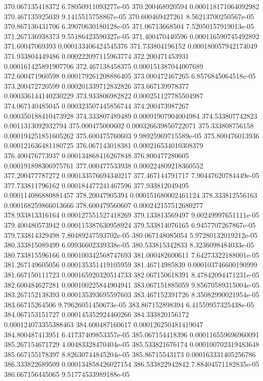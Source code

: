 {370.067135418372 6.78050911093277e-05
370.200468920594 0.000118171064092982
370.467135925039 9.1415515758867e-05
370.600469427261 8.56213700250567e-05
370.867136431706 6.39070630180128e-05
371.06713668504 7.52050157919013e-05
371.267136938373 9.55186423590327e-05
371.400470440596 0.000116590745492892
371.60047069393 0.000133406424545376
371.733804196152 0.000180057942174049
371.933804449486 0.000222097115963774
372.200471453931 0.000161425891907706
372.467138458375 0.000151387044007689
372.600471960598 0.000179261208886405
373.000472467265 6.8576845064518e-05
373.200472720599 0.000201339712832826
373.667139978377 0.000336144140230229
373.933806982822 0.000251127785504987
374.067140485045 0.000323507445856744
374.200473987267 0.000350188410473928
374.333807489489 0.00091907904004984
374.533807742823 0.0011313092932794
375.000475000602 0.000326639850722071
375.333808756158 0.000194251851605262
375.600475760603 9.98925969715589e-05
375.800476013936 0.000121636481180725
376.067143018381 0.000216534010308379
376.400476773937 0.000134868416267848
376.800477280605 0.000191898306975761
377.000477533938 0.000224809218360552
377.200477787272 0.000133576694340217
377.467144791717 7.90447620784449e-05
377.733811796162 0.000184477241467596
377.933812049495 0.000114086880881457
378.20047905394 0.000151680002461124
378.333812556163 0.000168259866013666
378.600479560607 0.000242157512680277
378.933813316164 0.000127551527418269
379.133813569497 9.00249997651111e-05
379.400480573942 0.000115387630958924
379.533814076165 6.9457707267867e-05
379.733814329498 7.80489247593702e-05
380.067148085054 5.97280132019212e-05
380.333815089499 6.09936602339338e-05
380.533815342833 8.3236098484033e-05
380.733815596166 0.000100342568747693
381.000482600611 7.64273322188001e-05
381.267149605056 0.000135351419105959
381.46714985839 0.000103746600190999
381.667150111723 0.000165920320514733
382.067150618391 8.47842094471231e-05
382.600484627281 0.000100225844904941
383.067151885059 9.85670589315004e-05
383.267152138393 0.000135393695597603
383.467152391726 8.35082990021954e-05
383.66715264506 9.79626051450673e-05
383.867152898394 6.41559957325438e-05
384.067153151727 0.000145352924460266
384.333820156172 0.000124073355388463
384.600487160617 0.000126250481419047
384.800487413951 6.41737409853357e-05
385.067154418396 0.000116559696960091
385.267154671729 4.00483328470404e-05
385.533821676174 0.000100702319483648
385.667155178397 8.82630744845204e-05
385.86715543173 0.000163331405256786
386.333822689509 0.000134858426027154
386.533822942842 7.88404571182835e-05
386.667156445065 9.51774533989188e-05
}
